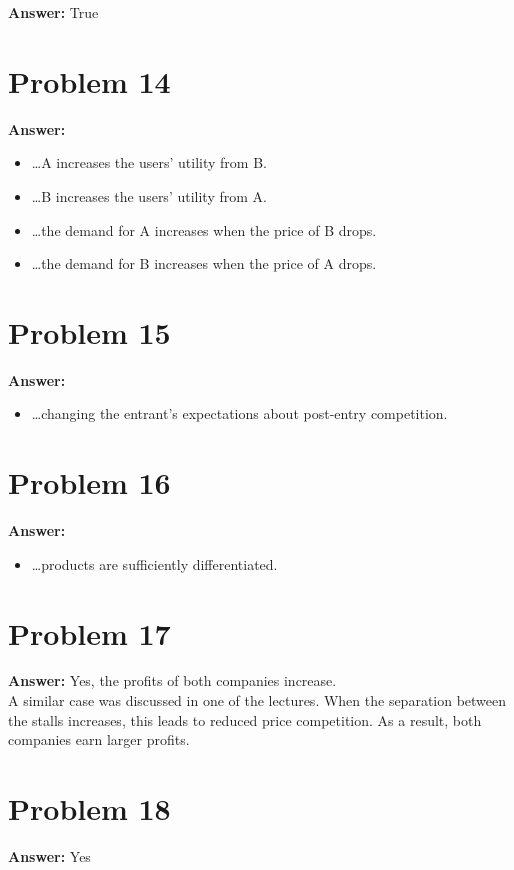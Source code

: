 \documentclass[11pt]{article}
\begin{document}
\textbf{Answer:} True
\section*{Problem 14}
\label{sec:org0fa92ea}

\textbf{Answer:}
\begin{itemize}
\item \ldots{}A increases the users' utility from B.
\item \ldots{}B increases the users' utility from A.
\item \ldots{}the demand for A increases when the price of B drops.
\item \ldots{}the demand for B increases when the price of A drops.
\end{itemize}
\section*{Problem 15}
\label{sec:orgd70f0cf}

\textbf{Answer:}
\begin{itemize}
\item \ldots{}changing the entrant's expectations about post-entry competition.
\end{itemize}
\section*{Problem 16}
\label{sec:org953e933}

\textbf{Answer:}
\begin{itemize}
\item \ldots{}products are sufficiently differentiated.
\end{itemize}
\section*{Problem 17}
\label{sec:org850aabc}

\textbf{Answer:} Yes, the profits of both companies increase.\\

A similar case was discussed in one of the lectures. When the separation
between the stalls increases, this leads to reduced price competition. As a
result, both companies earn larger profits.
\section*{Problem 18}
\label{sec:org50308cc}

\textbf{Answer:} Yes\\
\end{document}
